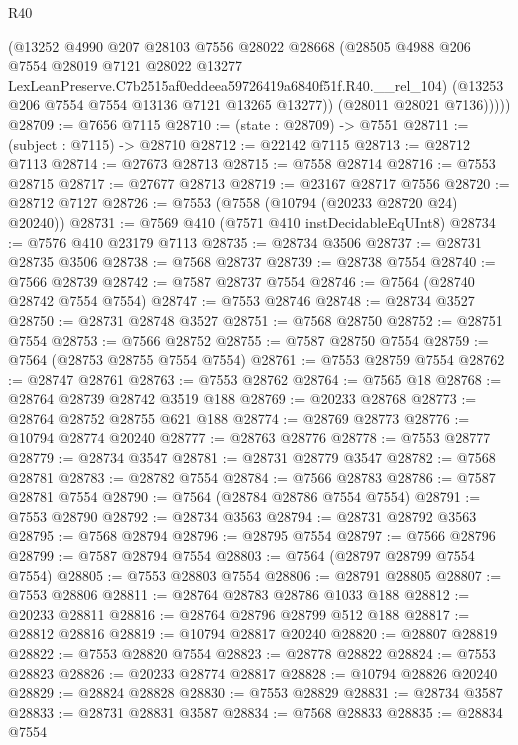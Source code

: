 \begin{lexlean}{R40}
\begin{coremodule}
            (@13252
              @4990
              @207
              @28103
              @7556
              @28022
              @28668
              (@28505
                @4988
                @206
                @7554
                @28019
                @7121
                @28022
                @13277
                LexLeanPreserve.C7b2515af0eddeea59726419a6840f51f.R40.__rel_104)
              (@13253 @206 @7554 @7554 @13136 @7121 @13265 @13277))
            (@28011 @28021 @7136)))))
@28709 := @7656 @7115
@28710 := (state : @28709) -> @7551
@28711 := (subject : @7115) -> @28710
@28712 := @22142 @7115
@28713 := @28712 @7113
@28714 := @27673 @28713
@28715 := @7558 @28714
@28716 := @7553 @28715
@28717 := @27677 @28713
@28719 := @23167 @28717 @7556
@28720 := @28712 @7127
@28726 := @7553 (@7558 (@10794 (@20233 @28720 @24) @20240))
@28731 := @7569 @410 (@7571 @410 instDecidableEqUInt8)
@28734 := @7576 @410 @23179 @7113
@28735 := @28734 @3506
@28737 := @28731 @28735 @3506
@28738 := @7568 @28737
@28739 := @28738 @7554
@28740 := @7566 @28739
@28742 := @7587 @28737 @7554
@28746 := @7564 (@28740 @28742 @7554 @7554)
@28747 := @7553 @28746
@28748 := @28734 @3527
@28750 := @28731 @28748 @3527
@28751 := @7568 @28750
@28752 := @28751 @7554
@28753 := @7566 @28752
@28755 := @7587 @28750 @7554
@28759 := @7564 (@28753 @28755 @7554 @7554)
@28761 := @7553 @28759 @7554
@28762 := @28747 @28761
@28763 := @7553 @28762
@28764 := @7565 @18
@28768 := @28764 @28739 @28742 @3519 @188
@28769 := @20233 @28768
@28773 := @28764 @28752 @28755 @621 @188
@28774 := @28769 @28773
@28776 := @10794 @28774 @20240
@28777 := @28763 @28776
@28778 := @7553 @28777
@28779 := @28734 @3547
@28781 := @28731 @28779 @3547
@28782 := @7568 @28781
@28783 := @28782 @7554
@28784 := @7566 @28783
@28786 := @7587 @28781 @7554
@28790 := @7564 (@28784 @28786 @7554 @7554)
@28791 := @7553 @28790
@28792 := @28734 @3563
@28794 := @28731 @28792 @3563
@28795 := @7568 @28794
@28796 := @28795 @7554
@28797 := @7566 @28796
@28799 := @7587 @28794 @7554
@28803 := @7564 (@28797 @28799 @7554 @7554)
@28805 := @7553 @28803 @7554
@28806 := @28791 @28805
@28807 := @7553 @28806
@28811 := @28764 @28783 @28786 @1033 @188
@28812 := @20233 @28811
@28816 := @28764 @28796 @28799 @512 @188
@28817 := @28812 @28816
@28819 := @10794 @28817 @20240
@28820 := @28807 @28819
@28822 := @7553 @28820 @7554
@28823 := @28778 @28822
@28824 := @7553 @28823
@28826 := @20233 @28774 @28817
@28828 := @10794 @28826 @20240
@28829 := @28824 @28828
@28830 := @7553 @28829
@28831 := @28734 @3587
@28833 := @28731 @28831 @3587
@28834 := @7568 @28833
@28835 := @28834 @7554

\end{coremodule}
\end{lexlean}

